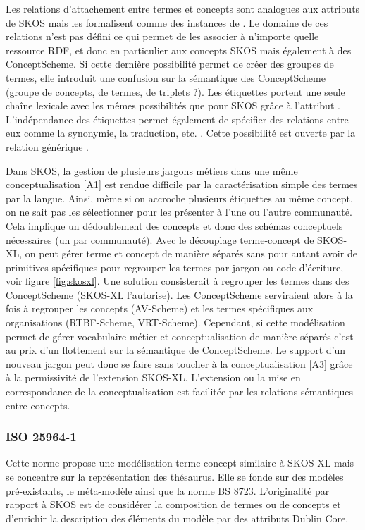 Les relations d'attachement entre termes et concepts sont analogues aux attributs de SKOS mais les formalisent comme des instances de . 
Le domaine de ces relations n'est pas défini ce qui permet de les associer à n'importe quelle ressource RDF, et donc en particulier aux concepts SKOS mais également à des ConceptScheme. 
Si cette dernière possibilité permet de créer des groupes de termes, elle introduit une confusion sur la sémantique des ConceptScheme (groupe de concepts, de termes, de triplets ?). 
Les étiquettes portent une seule chaîne lexicale avec les mêmes possibilités que pour SKOS grâce à l'attribut . 
L'indépendance des étiquettes permet également de spécifier des relations entre eux comme la synonymie, la traduction, etc. \cite{Pastor2009a}. 
Cette possibilité est ouverte par la relation générique . 


Dans SKOS, la gestion de plusieurs jargons métiers dans une même conceptualisation [A1] est rendue difficile par la caractérisation simple des termes par la langue. 
Ainsi, même si on accroche plusieurs étiquettes au même concept, on ne sait pas les sélectionner pour les présenter à l'une ou l'autre communauté. 
Cela implique un dédoublement des concepts et donc des schémas conceptuels nécessaires (un par communauté).%
Avec le découplage terme-concept de SKOS-XL, on peut gérer terme et concept de manière séparés sans pour autant avoir de primitives spécifiques pour regrouper les termes par jargon ou code d'écriture, voir figure \ref{fig:skosxl}. 
Une solution consisterait à regrouper les termes dans des ConceptScheme (SKOS-XL l'autorise).
Les ConceptScheme serviraient alors à la fois à regrouper les concepts (AV-Scheme) et les termes spécifiques aux organisations (RTBF-Scheme, VRT-Scheme). 
Cependant, si cette modélisation permet de gérer vocabulaire métier et conceptualisation de manière séparés c'est au prix d'un flottement sur la sémantique de ConceptScheme. 
Le support d'un nouveau jargon peut donc se faire sans toucher à la conceptualisation [A3] grâce à la permissivité de l'extension SKOS-XL. 
L'extension ou la mise en correspondance de la conceptualisation est facilitée par les relations sémantiques entre concepts.


\subsubsection{ISO 25964-1}
Cette norme propose une modélisation terme-concept similaire à SKOS-XL mais se concentre sur la représentation des thésaurus. 
Elle se fonde sur des modèles pré-existants, le méta-modèle \cite{Vandenbussche2009} ainsi que la norme BS 8723. 
L'originalité par rapport à SKOS est de considérer la composition de termes ou de concepts et d'enrichir la description des éléments du modèle par des attributs Dublin Core.

